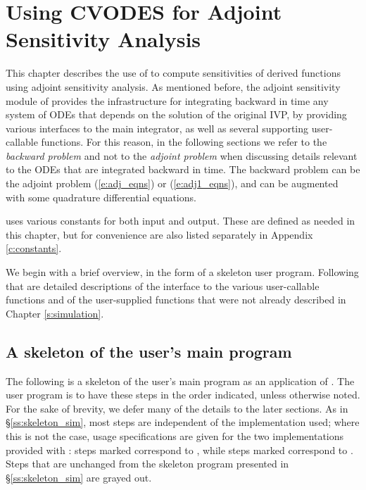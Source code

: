\chapter{Using CVODES for Adjoint Sensitivity Analysis}\label{s:adjoint}

This chapter describes the use of {\cvodes} to compute sensitivities of derived 
functions using adjoint sensitivity analysis. As mentioned before, the adjoint
sensitivity module of {\cvodes} provides the infrastructure for integrating
backward in time any system of ODEs that depends on the solution of the original
IVP, by providing various interfaces to the main {\cvodes} integrator, as well 
as several supporting user-callable functions. For this reason, in the following
sections we refer to the {\em backward problem} and not to the 
{\em adjoint problem} when discussing details relevant to the ODEs that
are integrated backward in  time. The backward problem can be the adjoint problem
(\ref{e:adj_eqns}) or (\ref{e:adj1_eqns}), and
can be augmented with some quadrature differential equations.

{\cvodes} uses various constants for both input and output.  These are
defined as needed in this chapter, but for convenience are also listed
separately in Appendix \ref{c:constants}.

We begin with a brief overview, in the form of a skeleton user program.
Following that are detailed descriptions of the interface to the
various user-callable functions and of the user-supplied functions that were not
already described in Chapter \ref{s:simulation}.

\section{A skeleton of the user's main program}
\label{ss:skeleton_adj}

The following is a skeleton of the user's main program as an application of
{\cvodes}. The user program is to have these steps in the order indicated, 
unless otherwise noted. For the sake of brevity, we defer many of the details to 
the later sections.
As in \S\ref{ss:skeleton_sim}, most steps are independent of the {\nvector}
implementation used; where this is not the case, usage specifications are given for the
two implementations provided with {\cvodes}: steps marked {\p} correspond to 
{\nvecp}, while steps marked {\s} correspond to {\nvecs}.
Steps that are unchanged from the skeleton program presented in
\S\ref{ss:skeleton_sim} are grayed out.


